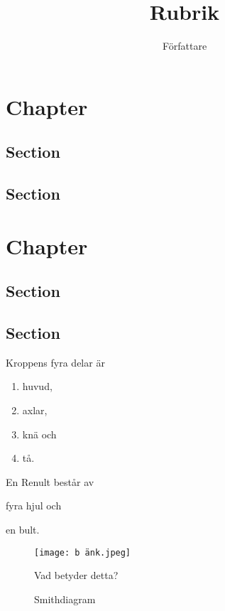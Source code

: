 \documentclass[a4paper, article]{memoir}
\title{Rubrik}
\author{Författare}
\begin{document}
\maketitle

\chapter{Chapter}
\section{Section}
\section{Section}

\chapter{Chapter}
\section{Section}
\section{Section}

Kroppens fyra delar är
\begin{enumerate}
\item huvud,
\item axlar,
\item knä och
\item tå.
\end{enumerate}
En Renult består av
\begin{enumerate*}[label=(\alph*)]
\item fyra hjul och
\item en bult.
\end{enumerate*}

\begin{figure}[ht]
\centering
\texttt{[image: b änk.jpeg]}
\caption{Vad betyder detta?}
\label{fig:bänk}
\end{figure}

\begin{figure}[ht]
\centering

\caption{Smithdiagram}
\label{fig:smith}
\end{figure}
\end{document}
